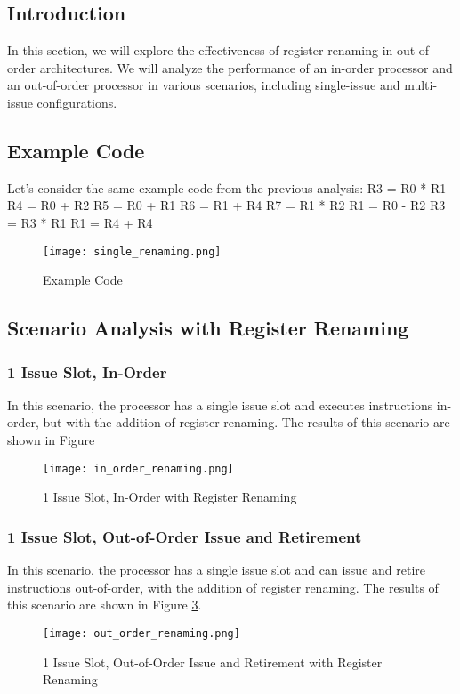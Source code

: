 \documentclass{article}
\begin{document}
\subsection{Introduction}
In this section, we will explore the effectiveness of register renaming in out-of-order architectures. We will analyze the performance of an in-order processor and an out-of-order processor in various scenarios, including single-issue and multi-issue configurations.
\subsection{Example Code}
Let's consider the same example code from the previous analysis:
R3 = R0 * R1
R4 = R0 + R2
R5 = R0 + R1
R6 = R1 + R4
R7 = R1 * R2
R1 = R0 - R2
R3 = R3 * R1
R1 = R4 + R4
\begin{figure}[H]
\centering
\texttt{[image: single\_renaming.png]}
\caption{Example Code}
\label{fig:example_code}
\end{figure}
\subsection{Scenario Analysis with Register Renaming}
\subsubsection{1 Issue Slot, In-Order}
In this scenario, the processor has a single issue slot and executes instructions in-order, but with the addition of register renaming. The results of this scenario are shown in Figure
\begin{figure}[H]
\centering
\texttt{[image: in\_order\_renaming.png]}
\caption{1 Issue Slot, In-Order with Register Renaming}
\label{fig:1_issue_in_order_renaming}
\end{figure}
\subsubsection{1 Issue Slot, Out-of-Order Issue and Retirement}
In this scenario, the processor has a single issue slot and can issue and retire instructions out-of-order, with the addition of register renaming. The results of this scenario are shown in Figure \ref{fig:1_issue_out_of_order_renaming}.
\begin{figure}[H]
\centering
\texttt{[image: out\_order\_renaming.png]}
\caption{1 Issue Slot, Out-of-Order Issue and Retirement with Register Renaming}
\label{fig:1_issue_out_of_order_renaming}
\end{figure}
\end{document}
